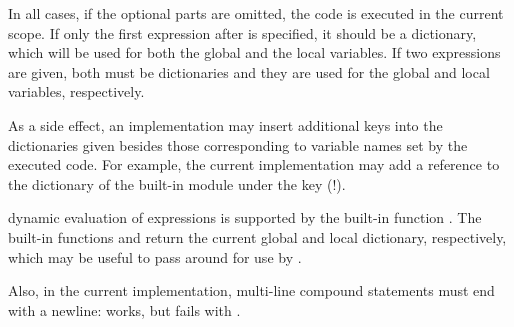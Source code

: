 In all cases, if the optional parts are omitted, the code is executed
in the current scope.  If only the first expression after 
is specified, it should be a dictionary, which will be used for both
the global and the local variables.  If two expressions are given,
both must be dictionaries and they are used for the global and local
variables, respectively.

As a side effect, an implementation may insert additional keys into
the dictionaries given besides those corresponding to variable names
set by the executed code.  For example, the current implementation
may add a reference to the dictionary of the built-in module
 under the key  (!).

dynamic evaluation of expressions is supported by the built-in
function .  The built-in functions
 and  return the current global
and local dictionary, respectively, which may be useful to pass around
for use by .

Also, in the current implementation, multi-line compound statements must
end with a newline:
 works, but
 fails with
.
  

